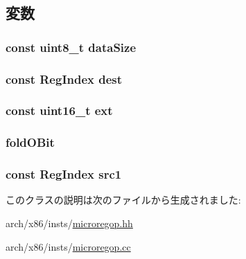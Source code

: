 \subsection{変数}
\hypertarget{classX86ISA_1_1RegOpBase_a107c258b340f17c2bfd8326ada8441ce}{
\subsubsection[{dataSize}]{\setlength{\rightskip}{0pt plus 5cm}const uint8\_\-t {\bf dataSize}}}
\label{classX86ISA_1_1RegOpBase_a107c258b340f17c2bfd8326ada8441ce}
\hypertarget{classX86ISA_1_1RegOpBase_ab74217a19b7ae8f204175991a8087f1e}{
\subsubsection[{dest}]{\setlength{\rightskip}{0pt plus 5cm}const {\bf RegIndex} {\bf dest}}}
\label{classX86ISA_1_1RegOpBase_ab74217a19b7ae8f204175991a8087f1e}
\hypertarget{classX86ISA_1_1RegOpBase_a389186ffbf742eed7830fbe38d05f08c}{
\subsubsection[{ext}]{\setlength{\rightskip}{0pt plus 5cm}const uint16\_\-t {\bf ext}}}
\label{classX86ISA_1_1RegOpBase_a389186ffbf742eed7830fbe38d05f08c}
\hypertarget{classX86ISA_1_1RegOpBase_a90c82d522b8ec23488d1dab400eb43d8}{
\subsubsection[{foldOBit}]{ {\bf foldOBit}}}
\label{classX86ISA_1_1RegOpBase_a90c82d522b8ec23488d1dab400eb43d8}
\hypertarget{classX86ISA_1_1RegOpBase_ac0ec0327e65bf2376ccab1d826a7094e}{
\subsubsection[{src1}]{\setlength{\rightskip}{0pt plus 5cm}const {\bf RegIndex} {\bf src1}}}
\label{classX86ISA_1_1RegOpBase_ac0ec0327e65bf2376ccab1d826a7094e}


このクラスの説明は次のファイルから生成されました:\begin{DoxyCompactItemize}
\item 
arch/x86/insts/\hyperlink{microregop_8hh}{microregop.hh}\item 
arch/x86/insts/\hyperlink{microregop_8cc}{microregop.cc}\end{DoxyCompactItemize}
